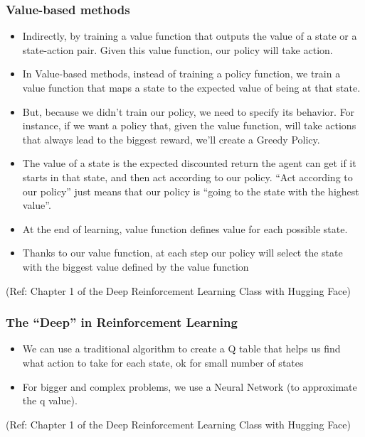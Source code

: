 \begin{frame}[fragile]\frametitle{Value-based methods}

\begin{itemize}
\item Indirectly, by training a value function that outputs the value of a state or a state-action pair. Given this value function, our policy will take action.
\item In Value-based methods, instead of training a policy function, we train a value function that maps a state to the expected value of being at that state.
\item But, because we didn't train our policy, we need to specify its behavior. For instance, if we want a policy that, given the value function, will take actions that always lead to the biggest reward, we'll create a Greedy Policy.
\item The value of a state is the expected discounted return the agent can get if it starts in that state, and then act according to our policy. ``Act according to our policy'' just means that our policy is “going to the state with the highest value”.
\item At the end of learning, value function defines value for each possible state.
\item Thanks to our value function, at each step our policy will select the state with the biggest value defined by the value function
\end{itemize}


{\tiny (Ref: Chapter 1 of the Deep Reinforcement Learning Class with Hugging Face)}


\end{frame}


\begin{frame}[fragile]\frametitle{The ``Deep'' in Reinforcement Learning}

\begin{itemize}
\item We can use a traditional algorithm to create a Q table that helps us find what action to take for each state, ok for small number of states
\item For bigger and complex problems, we use a Neural Network (to approximate the q value).
\end{itemize}


{\tiny (Ref: Chapter 1 of the Deep Reinforcement Learning Class with Hugging Face)}


\end{frame}

